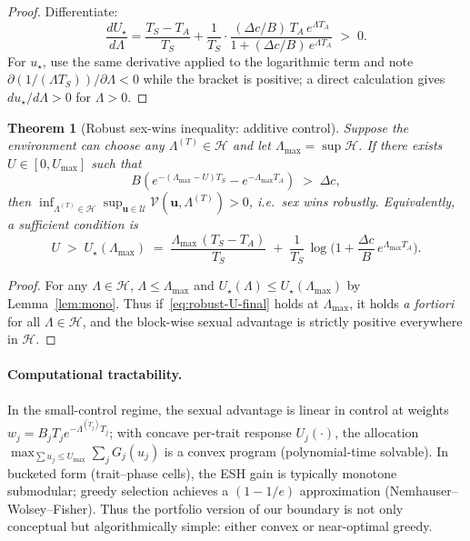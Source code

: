 \documentclass[11pt]{article}
\theoremstyle{upright}
\newtheorem{theorem}{Theorem}
\newcommand{\horizon}{\Lambda}
\newcommand{\Lmax}{\horizon^{(T)}_{\max}}
\newcommand{\Uset}{\mathcal{U}}
\newcommand{\Hset}{\mathcal{H}}
\newcommand{\hazT}[1]{\Lambda^{(#1)}}          %
\renewcommand{\Lmax}{\Lambda_{\max}}
\begin{document}
\begin{proof}
Differentiate:
\[
\frac{d U_\star}{d\Lambda}
= \frac{T_S-T_A}{T_S} + \frac{1}{T_S}\cdot \frac{(\Delta c/B)\,T_A\,e^{\Lambda T_A}}{1+(\Delta c/B)\,e^{\Lambda T_A}}
\;>\; 0.
\]
For $u_\star$, use the same derivative applied to the logarithmic term and note $\partial(1/(\Lambda T_S))/\partial\Lambda<0$ while the bracket is positive; a direct calculation gives $du_\star/d\Lambda>0$ for $\Lambda>0$.
\end{proof}

\begin{theorem}[Robust sex-wins inequality: additive control]\label{thm:robust-add}
Suppose the environment can choose any $\hazT{T}\in\Hset$ and let $\Lmax=\sup\Hset$.
If there exists $U\in[0,U_{\max}]$ such that
\begin{equation}\label{eq:robust-U-final}
B\!\left(e^{-(\Lmax-U)T_S}-e^{-\Lmax T_A}\right) \;>\; \Delta c,
\end{equation}
then $\inf_{\hazT{T}\in\Hset}\sup_{\mathbf u\in\Uset} \mathcal V(\mathbf u,\hazT{T})>0$, i.e.\ sex wins robustly.
Equivalently, a sufficient condition is
\[
U \;>\; U_\star(\Lmax)
\;=\; \frac{\Lmax\,(T_S-T_A)}{T_S} \;+\; \frac{1}{T_S}\,\log\!\Big(1+\frac{\Delta c}{B}\,e^{\Lmax T_A}\Big).
\]
\end{theorem}

\begin{proof}
For any $\Lambda\in\Hset$, $\Lambda\le \Lmax$ and $U_\star(\Lambda)\le U_\star(\Lmax)$ by Lemma~\ref{lem:mono}.
Thus if~\eqref{eq:robust-U-final} holds at $\Lmax$, it holds \emph{a fortiori} for all $\Lambda\in\Hset$,
and the block-wise sexual advantage is strictly positive everywhere in $\Hset$.
\end{proof}

\paragraph{Computational tractability.}
In the small-control regime, the sexual advantage is linear in control at weights
$w_j=B_j T_j e^{-\Lambda^{(T_j)}T_j}$; with concave per-trait response $U_j(\cdot)$, the allocation
$\max_{\sum u_j\le U_{\max}}\sum_j G_j(u_j)$ is a convex program (polynomial-time solvable).
In bucketed form (trait–phase cells), the ESH gain is typically monotone submodular; greedy selection achieves a
$(1-1/e)$ approximation (Nemhauser–Wolsey–Fisher). Thus the portfolio version of our boundary is not only conceptual
but algorithmically simple: either convex or near-optimal greedy.
\end{document}
